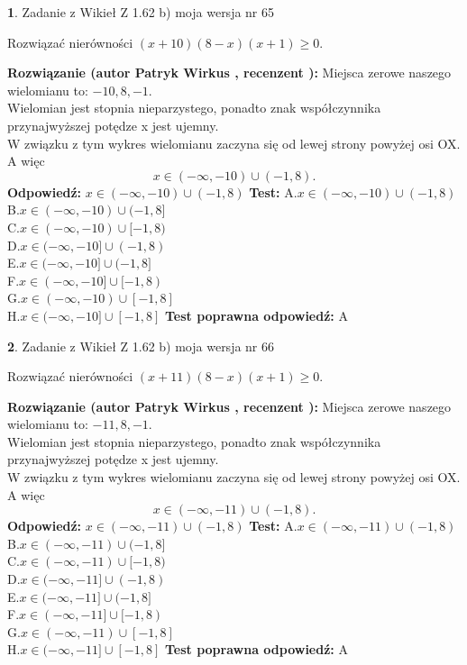\documentclass[12pt, a4paper]{article}
\theoremstyle{definition} %
\newtheorem{zad}{}
\newcommand{\zadStart}[1]{\begin{zad}#1\newline}
\newcommand{\zadStop}{\end{zad}}
\newcommand{\rozwStart}[2]{\noindent \textbf{Rozwiązanie (autor #1 , recenzent #2): }\newline}
\newcommand{\rozwStop}{\newline}
\newcommand{\odpStart}{\noindent \textbf{Odpowiedź:}\newline}
\newcommand{\odpStop}{\newline}
\newcommand{\testStart}{\noindent \textbf{Test:}\newline}
\newcommand{\testStop}{\newline}
\newcommand{\kluczStart}{\noindent \textbf{Test poprawna odpowiedź:}\newline}
\newcommand{\kluczStop}{\newline}
\begin{document}
\zadStart{Zadanie z Wikieł Z 1.62 b) moja wersja nr 65}

Rozwiązać nierówności $(x+10)(8-x)(x+1)\ge0$.
\zadStop
\rozwStart{Patryk Wirkus}{}
Miejsca zerowe naszego wielomianu to: $-10, 8, -1$.\\
Wielomian jest stopnia nieparzystego, ponadto znak współczynnika przy\linebreak najwyższej potędze x jest ujemny.\\ W związku z tym wykres wielomianu zaczyna się od lewej strony powyżej osi OX. A więc $$x \in (-\infty,-10) \cup (-1,8).$$
\rozwStop
\odpStart
$x \in (-\infty,-10) \cup (-1,8)$
\odpStop
\testStart
A.$x \in (-\infty,-10) \cup (-1,8)$\\
B.$x \in (-\infty,-10) \cup (-1,8]$\\
C.$x \in (-\infty,-10) \cup [-1,8)$\\
D.$x \in (-\infty,-10] \cup (-1,8)$\\
E.$x \in (-\infty,-10] \cup (-1,8]$\\
F.$x \in (-\infty,-10] \cup [-1,8)$\\
G.$x \in (-\infty,-10) \cup [-1,8]$\\
H.$x \in (-\infty,-10] \cup [-1,8]$
\testStop
\kluczStart
A
\kluczStop



\zadStart{Zadanie z Wikieł Z 1.62 b) moja wersja nr 66}

Rozwiązać nierówności $(x+11)(8-x)(x+1)\ge0$.
\zadStop
\rozwStart{Patryk Wirkus}{}
Miejsca zerowe naszego wielomianu to: $-11, 8, -1$.\\
Wielomian jest stopnia nieparzystego, ponadto znak współczynnika przy\linebreak najwyższej potędze x jest ujemny.\\ W związku z tym wykres wielomianu zaczyna się od lewej strony powyżej osi OX. A więc $$x \in (-\infty,-11) \cup (-1,8).$$
\rozwStop
\odpStart
$x \in (-\infty,-11) \cup (-1,8)$
\odpStop
\testStart
A.$x \in (-\infty,-11) \cup (-1,8)$\\
B.$x \in (-\infty,-11) \cup (-1,8]$\\
C.$x \in (-\infty,-11) \cup [-1,8)$\\
D.$x \in (-\infty,-11] \cup (-1,8)$\\
E.$x \in (-\infty,-11] \cup (-1,8]$\\
F.$x \in (-\infty,-11] \cup [-1,8)$\\
G.$x \in (-\infty,-11) \cup [-1,8]$\\
H.$x \in (-\infty,-11] \cup [-1,8]$
\testStop
\kluczStart
A
\kluczStop
\end{document}
